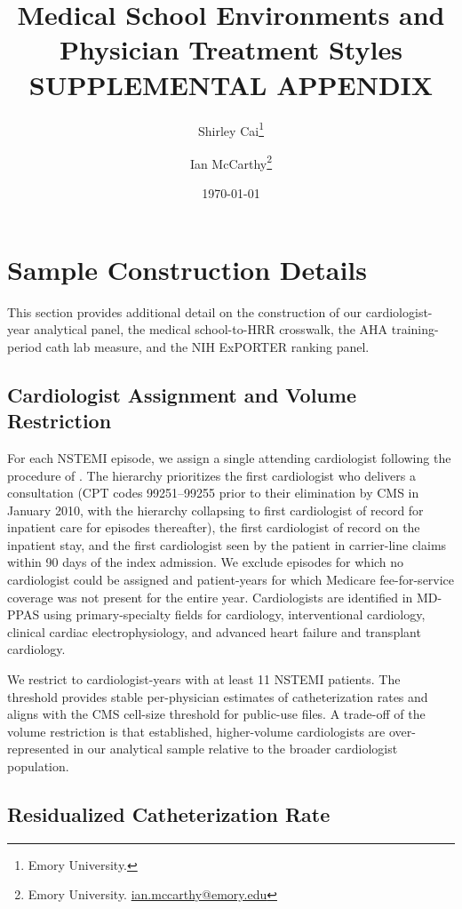 \documentclass[12pt]{article}
\title{Medical School Environments and Physician Treatment Styles \\[0.5em]
\large SUPPLEMENTAL APPENDIX}
\author{Shirley Cai\thanks{Emory University.} \and Ian McCarthy\thanks{Emory University.
\href{mailto:ian.mccarthy@emory.edu}{ian.mccarthy@emory.edu}}}
\date{\today}
\let\textcite\citet
\begin{document}
\maketitle

\section{Sample Construction Details}\label{sec:app-sample}

This section provides additional detail on the construction of our cardiologist-year analytical panel, the medical school-to-HRR crosswalk, the AHA training-period cath lab measure, and the NIH ExPORTER ranking panel.

\subsection{Cardiologist Assignment and Volume Restriction}

For each NSTEMI episode, we assign a single attending cardiologist following the procedure of \textcite{molitor2018}. The hierarchy prioritizes the first cardiologist who delivers a consultation (CPT codes 99251--99255 prior to their elimination by CMS in January 2010, with the hierarchy collapsing to first cardiologist of record for inpatient care for episodes thereafter), the first cardiologist of record on the inpatient stay, and the first cardiologist seen by the patient in carrier-line claims within 90 days of the index admission. We exclude episodes for which no cardiologist could be assigned and patient-years for which Medicare fee-for-service coverage was not present for the entire year. Cardiologists are identified in MD-PPAS using primary-specialty fields for cardiology, interventional cardiology, clinical cardiac electrophysiology, and advanced heart failure and transplant cardiology.

We restrict to cardiologist-years with at least 11 NSTEMI patients. The threshold provides stable per-physician estimates of catheterization rates and aligns with the CMS cell-size threshold for public-use files. A trade-off of the volume restriction is that established, higher-volume cardiologists are over-represented in our analytical sample relative to the broader cardiologist population.

\subsection{Residualized Catheterization Rate}
\end{document}
